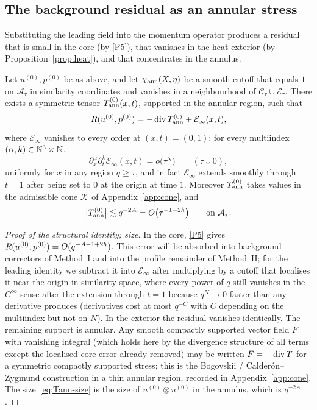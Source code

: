 \subsection{The background residual as an annular stress}

Substituting the leading field into the momentum operator produces a residual that is small in the core (by \ref{P5}), that vanishes in the heat exterior (by Proposition~\ref{prop:heat}), and that concentrates in the annulus.

\begin{proposition}
\label{prop:Tann}
Let $u^{(0)},p^{(0)}$ be as above, and let $\chi_{\mathrm{ann}}(X,\eta)$ be a smooth cutoff that equals $1$ on $\mathcal A_\tau$ in similarity coordinates and vanishes in a neighbourhood of $\mathcal C_\tau\cup\mathcal E_\tau$. There exists a symmetric tensor $T^{(0)}_{\mathrm{ann}}(x,t)$, supported in the annular region, such that
\begin{equation}
\label{eq:Tann}
R(u^{(0)},p^{(0)})
=-\operatorname{div} T^{(0)}_{\mathrm{ann}}
+\mathcal E_{\infty}(x,t),
\end{equation}
where $\mathcal E_{\infty}$ vanishes to every order at $(x,t)=(0,1)$: for every multiindex $(\alpha,k)\in\mathbb{N}^3\times\mathbb{N}$,
\[
\partial_x^\alpha\partial_t^k \mathcal E_{\infty}(x,t)=o\bigl(\tau^N\bigr)
\qquad(\tau\downarrow 0),
\]
uniformly for $x$ in any region $q\ge \tau$, and in fact $\mathcal E_{\infty}$ extends smoothly through $t=1$ after being set to $0$ at the origin at time $1$. Moreover $T^{(0)}_{\mathrm{ann}}$ takes values in the admissible cone $\mathcal K$ of Appendix~\ref{app:cone}, and
\begin{equation}
\label{eq:Tann-size}
\bigl|T^{(0)}_{\mathrm{ann}}\bigr|
\lesssim q^{-2A}
=O\bigl(\tau^{-1-2h}\bigr)
\qquad\text{on }\mathcal A_\tau.
\end{equation}
\end{proposition}

\begin{proof}[Proof of the structural identity; size]
In the core, \ref{P5} gives $R(u^{(0)},p^{(0)})=O(q^{-A-1+2h})$. This error will be absorbed into background correctors of Method~I and into the profile remainder of Method~II; for the leading identity we subtract it into $\mathcal E_{\infty}$ after multiplying by a cutoff that localises it near the origin in similarity space, where every power of $q$ still vanishes in the $C^\infty$ sense after the extension through $t=1$ because $q^{N}\to 0$ faster than any derivative produces (derivatives cost at most $q^{-C}$ with $C$ depending on the multiindex but not on $N$). In the exterior the residual vanishes identically. The remaining support is annular. Any smooth compactly supported vector field $F$ with vanishing integral (which holds here by the divergence structure of all terms except the localised core error already removed) may be written $F=-\operatorname{div} T$ for a symmetric compactly supported stress; this is the {B}ogovskii / {C}alder{\'o}n--{Z}ygmund construction in a thin annular region, recorded in Appendix~\ref{app:cone}. The size~\eqref{eq:Tann-size} is the size of $u^{(0)}\otimes u^{(0)}$ in the annulus, which is $q^{-2A}$.
\end{proof}

